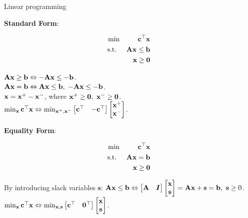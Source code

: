 \documentclass[11pt,compress,t,notes=noshow, xcolor=table]{beamer}
\begin{document}
\begin{vbframe}{Linear programming}
\framebreak

\textbf{Standard Form}:
\vspace{-\baselineskip}

\begin{eqnarray*}
\min && \mathbf{c}^\top\mathbf{x} \\
\text{s.t. } && \mathbf{A}\mathbf{x} \le \mathbf{b}\\
&& \mathbf{x} \ge \mathbf{0} \\
\end{eqnarray*}

$\mathbf{A}\mathbf{x} \ge \mathbf{b} \Leftrightarrow -\mathbf{A}\mathbf{x} \le -\mathbf{b}$.\\
$\mathbf{A}\mathbf{x} = \mathbf{b} \Leftrightarrow \mathbf{A}\mathbf{x} \le \mathbf{b},\ -\mathbf{A}\mathbf{x} \le -\mathbf{b}$.\\
$\mathbf{x} = \mathbf{x}^+ - \mathbf{x}^-$, where $\mathbf{x}^+ \ge \mathbf{0},\ \mathbf{x}^- \ge \mathbf{0}$.\\
$\min_{\mathbf{x}} \mathbf{c}^\top\mathbf{x} \Leftrightarrow \min_{\mathbf{x}^+, \mathbf{x}^-} \begin{bmatrix} \mathbf{c}^\top & -\mathbf{c}^\top \end{bmatrix} \begin{bmatrix} \mathbf{x}^+ \\ \mathbf{x}^- \end{bmatrix}$.

\framebreak
\textbf{Equality Form}:
\vspace{-\baselineskip}

\begin{eqnarray*}
\min && \mathbf{c}^\top\mathbf{x} \\
\text{s.t. } && \mathbf{A}\mathbf{x} = \mathbf{b}\\
&& \mathbf{x} \ge \mathbf{0} \\
\end{eqnarray*}

By introducing slack variables $\mathbf{s}$:
$\Amat\xv \le \mathbf{b} \Leftrightarrow \begin{bmatrix} \Amat & \id \end{bmatrix} \begin{bmatrix} \xv \\ \mathbf{s} \end{bmatrix} = \Amat\xv + \mathbf{s} = \mathbf{b},\ \mathbf{s} \ge 0$.\\
$\min_{\mathbf{x}} \mathbf{c}^\top\mathbf{x} \Leftrightarrow \min_{\mathbf{x},\mathbf{s}} \begin{bmatrix} \mathbf{c}^\top & \mathbf{0}^\top \end{bmatrix} \begin{bmatrix} \mathbf{x} \\ \mathbf{s} \end{bmatrix}$.

\end{vbframe}
\end{document}
